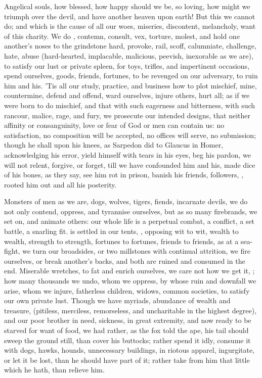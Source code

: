 {Angelical souls, how blessed, how happy should we be, so loving, how
might we triumph over the devil, and have another heaven upon earth!
But this we cannot do; and which is the cause of all our woes,
miseries, discontent, melancholy, want of this charity. We do
, contemn, consult, vex, torture, molest, and hold one
another's noses to the grindstone hard, provoke, rail, scoff,
calumniate, challenge, hate, abuse (hard-hearted, implacable,
malicious, peevish, inexorable as we are), to satisfy our lust or
private spleen, for toys, trifles, and impertinent occasions,
spend ourselves, goods, friends, fortunes, to be revenged on our
adversary, to ruin him and his. 'Tis all our study, practice, and
business how to plot mischief, mine, countermine, defend and offend,
ward ourselves, injure others, hurt all; as if we were born to do
mischief, and that with such eagerness and bitterness, with such
rancour, malice, rage, and fury, we prosecute our intended designs,
that neither affinity or consanguinity, love or fear of God or men can
contain us: no satisfaction, no composition will be accepted, no
offices will serve, no submission; though he shall upon his knees, as
Sarpedon did to Glaucus in Homer, acknowledging his error, yield
himself with tears in his eyes, beg his pardon, we will not relent,
forgive, or forget, till we have confounded him and his, made dice of
his bones, as they say, see him rot in prison, banish his friends,
followers, , rooted him out and all his posterity.

Monsters of men as we are, dogs, wolves, tigers, fiends,
incarnate devils, we do not only contend, oppress, and tyrannise
ourselves, but as so many firebrands, we set on, and animate others:
our whole life is a perpetual combat, a conflict, a set battle, a
snarling fit.  is settled in our tents, ,
opposing wit to wit, wealth to wealth, strength to strength, fortunes
to fortunes, friends to friends, as at a sea-fight, we turn our
broadsides, or two millstones with continual attrition, we fire
ourselves, or break another's backs, and both are ruined and consumed
in the end. Miserable wretches, to fat and enrich ourselves, we care
not how we get it, ; how many thousands we undo, whom
we oppress, by whose ruin and downfall we arise, whom we injure,
fatherless children, widows, common societies, to satisfy our own
private lust. Though we have myriads, abundance of wealth and treasure,
(pitiless, merciless, remorseless, and uncharitable in the highest
degree), and our poor brother in need, sickness, in great extremity,
and now ready to be starved for want of food, we had rather, as the fox
told the ape, his tail should sweep the ground still, than cover his
buttocks; rather spend it idly, consume it with dogs, hawks, hounds,
unnecessary buildings, in riotous apparel, ingurgitate, or let it be
lost, than he should have part of it; rather take from him that
little which he hath, than relieve him.

}

